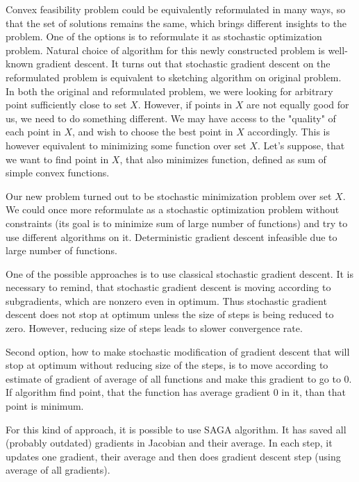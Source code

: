 \documentclass[11pt]{book}
\begin{document}
Convex feasibility problem could be equivalently reformulated in many ways, so that the set of solutions remains the same, which brings different insights to the problem. One of the options is to reformulate it as stochastic optimization problem. Natural choice of algorithm for this newly constructed problem is well-known gradient descent. It turns out that stochastic gradient descent on the reformulated problem is equivalent to sketching algorithm on original problem.\\

In both the original and reformulated problem, we were looking for arbitrary point sufficiently close to set $X$. However, if points in $X$ are not equally good for us, we need to do something different. We may have access to the "quality" of each point in $X$, and wish to choose the best point in $X$ accordingly. This is however equivalent to minimizing some function over set $X$. Let's suppose, that we want to find point in $X$, that also minimizes function, defined as sum of simple convex functions.

Our new problem turned out to be stochastic minimization problem over set $X$. We could once more reformulate as a stochastic optimization problem without constraints (its goal is to minimize sum of large number of functions) and try to use different algorithms on it. Deterministic gradient descent infeasible due to large number of functions.

One of the possible approaches is to use classical stochastic gradient descent. It is necessary to remind, that stochastic gradient descent is moving according to subgradients, which are nonzero even in optimum. Thus stochastic gradient descent does not stop at optimum unless the size of steps is being reduced to zero. However, reducing size of steps leads to slower convergence rate.

Second option, how to make stochastic modification of gradient descent that will stop at optimum without reducing size of the steps, is to move according to estimate of gradient of average of all functions and make this gradient to go to $0$. If algorithm find point, that the function has average gradient $0$  in it, than that point is minimum. 

For this kind of approach, it is possible to use SAGA algorithm. It has saved all (probably outdated) gradients in Jacobian and their average. In each step, it updates one gradient, their average and then does gradient descent step (using average of all gradients). 
\end{document}
